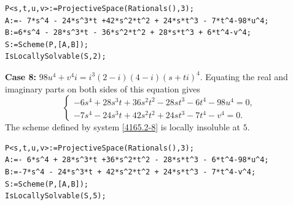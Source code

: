 \documentclass[a4paper,12pt,english,reqno]{amsart}
\begin{document}
\begin{lstlisting}
P<s,t,u,v>:=ProjectiveSpace(Rationals(),3);
A:=- 7*s^4 - 24*s^3*t +42*s^2*t^2 + 24*s*t^3 - 7*t^4-98*u^4;
B:=6*s^4 - 28*s^3*t - 36*s^2*t^2 + 28*s*t^3 + 6*t^4-v^4;
S:=Scheme(P,[A,B]);
IsLocallySolvable(S,2);
\end{lstlisting}

{\bf Case 8:} $98u^4+v^4i=i^3(2-i)(4-i)(s+ti)^4$. Equating the real and imaginary parts on both sides of this equation gives
\begin{equation}\label{4165.2-8}
\begin{cases}
-6s^4 + 28s^3t + 36s^2t^2 - 28st^3 - 6t^4 - 98u^4=0,\\
-7s^4 - 24s^3t + 42s^2t^2 + 24st^3 - 7t^4 - v^4=0.
\end{cases}
\end{equation}
The scheme defined by system \eqref{4165.2-8} is locally insoluble at $5$.

\begin{lstlisting}
P<s,t,u,v>:=ProjectiveSpace(Rationals(),3);
A:=- 6*s^4 + 28*s^3*t +36*s^2*t^2 - 28*s*t^3 - 6*t^4-98*u^4;
B:=-7*s^4 - 24*s^3*t + 42*s^2*t^2 + 24*s*t^3 - 7*t^4-v^4;
S:=Scheme(P,[A,B]);
IsLocallySolvable(S,5);
\end{lstlisting}
\end{document}
